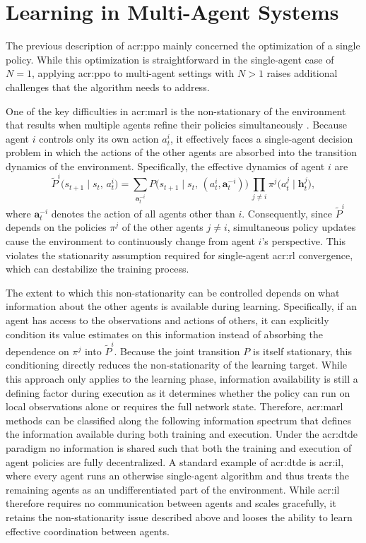 \section{Learning in Multi-Agent Systems}
\label{sec:marl-learning}
The previous description of \gls{acr:ppo} mainly concerned the optimization of a single policy. While this optimization is straightforward in the single-agent case of $N=1$, applying \gls{acr:ppo} to multi-agent settings with $N>1$ raises additional challenges that the algorithm needs to address.

One of the key difficulties in \gls{acr:marl} is the non-stationary of the environment that results when multiple agents refine their policies simultaneously \citep{Stefanomarlbook}. Because agent $i$ controls only its own action $a^i_t$, it effectively faces a single-agent decision problem in which the actions of the other agents are absorbed into the transition dynamics of the environment. Specifically, the effective dynamics of agent $i$ are 
\begin{equation}
\label{eq:nonstationary-transition}
    \tilde{P}^i\big(s_{t+1}\mid s_t,\, a^i_t\big)
    = \sum_{\mathbf{a}^{-i}_t} P\big(s_{t+1}\mid s_t,\, (a^i_t,\mathbf{a}^{-i}_t)\big)\,
      \prod_{j\neq i}\pi^j\big(a^j_t\mid \mathbf{h}^j_t\big),
\end{equation}
where $\mathbf{a}^{-i}_t$ denotes the action of all agents other than $i$. Consequently, since $\tilde{P}^i$ depends on the policies $\pi^j$ of the other agents $j\ne i$, simultaneous policy updates cause the environment to continuously change from agent $i$'s perspective. This violates the stationarity assumption required for single-agent \gls{acr:rl} convergence, which can destabilize the training process.

The extent to which this non-stationarity can be controlled depends on what information about the other agents is available during learning. Specifically, if an agent has access to the observations and actions of others, it can explicitly condition its value estimates on this information instead of absorbing the dependence on $\pi^j$ into $\tilde P^i$. Because the joint transition $P$ is itself stationary, this conditioning directly reduces the non-stationarity of the learning target. While this approach only applies to the learning phase, information availability is still a defining factor during execution as it determines whether the policy can run on local observations alone or requires the full network state.
Therefore, \gls{acr:marl} methods can be classified along the following information spectrum that defines the information available during both training and execution. Under the \gls{acr:dtde} paradigm no information is shared such that both the training and execution of agent policies are fully decentralized. A standard example of \gls{acr:dtde} is \gls{acr:il}, where every agent runs an otherwise single-agent algorithm and thus treats the remaining agents as an undifferentiated part of the environment. While \gls{acr:il} therefore requires no communication between agents and scales gracefully, it retains the non-stationarity issue described above and looses the ability to learn effective coordination between agents. 


